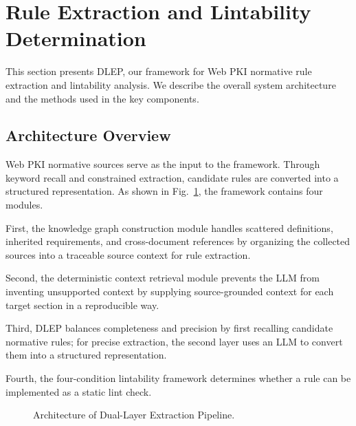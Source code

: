 \section{Rule Extraction and Lintability Determination}
\label{sec:methodology}

This section presents DLEP, our framework for Web PKI normative rule extraction and lintability analysis.
We describe the overall system architecture and the methods used in the key components.

\subsection{Architecture Overview}
\label{sec:method-overview}

Web PKI normative sources serve as the input to the framework. Through keyword recall and constrained extraction, candidate rules are converted into a structured representation. As shown in Fig.~\ref{fig:architecture}, the framework contains four modules.

First, the knowledge graph construction module handles scattered definitions, inherited requirements, and cross-document references by organizing the collected sources into a traceable source context for rule extraction.

Second, the deterministic context retrieval module prevents the LLM from inventing unsupported context by supplying source-grounded context for each target section in a reproducible way.

Third, DLEP balances completeness and precision by first recalling candidate normative rules; for precise extraction, the second layer uses an LLM to convert them into a structured representation.

Fourth, the four-condition lintability framework determines whether a rule can be implemented as a static lint check.

\begin{figure}[tb]
  \centering
  \caption{Architecture of Dual-Layer Extraction Pipeline.}
  \label{fig:architecture}
\end{figure}

